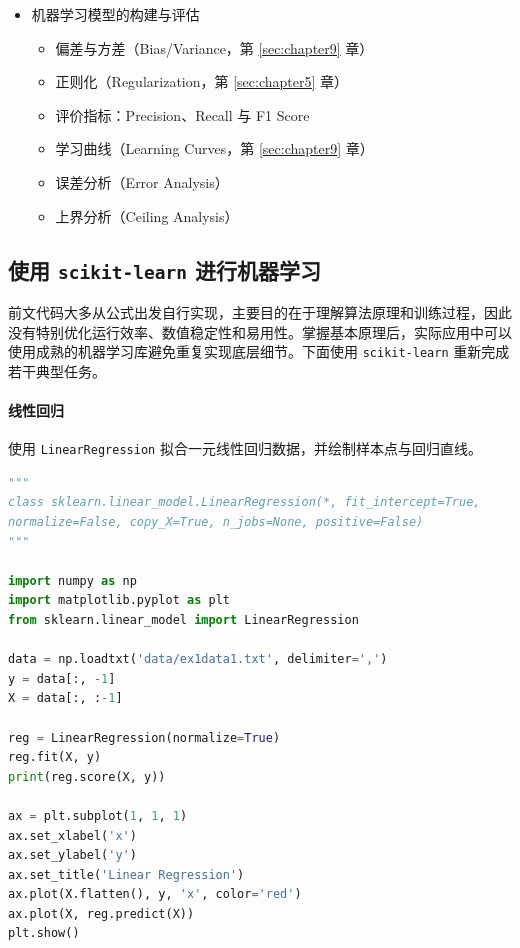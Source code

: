 \begin{itemize}
    \item 机器学习模型的构建与评估
      \begin{itemize}
        \item 偏差与方差（Bias/Variance，第 \ref{sec:chapter9} 章）
        \item 正则化（Regularization，第 \ref{sec:chapter5} 章）
        \item 评价指标：Precision、Recall 与 F1 Score
        \item 学习曲线（Learning Curves，第 \ref{sec:chapter9} 章）
        \item 误差分析（Error Analysis）
        \item 上界分析（Ceiling Analysis）
      \end{itemize}
\end{itemize}


\subsection{使用 \texttt{scikit-learn} 进行机器学习}

前文代码大多从公式出发自行实现，主要目的在于理解算法原理和训练过程，因此没有特别优化运行效率、数值稳定性和易用性。掌握基本原理后，实际应用中可以使用成熟的机器学习库避免重复实现底层细节。下面使用 \texttt{scikit-learn} 重新完成若干典型任务。

\paragraph{线性回归}

使用 \texttt{LinearRegression} 拟合一元线性回归数据，并绘制样本点与回归直线。

\begin{center}
\begin{lstlisting}[language=Python]
"""
class sklearn.linear_model.LinearRegression(*, fit_intercept=True, 
normalize=False, copy_X=True, n_jobs=None, positive=False)
"""

import numpy as np
import matplotlib.pyplot as plt
from sklearn.linear_model import LinearRegression

data = np.loadtxt('data/ex1data1.txt', delimiter=',')
y = data[:, -1]
X = data[:, :-1]

reg = LinearRegression(normalize=True)
reg.fit(X, y)
print(reg.score(X, y))

ax = plt.subplot(1, 1, 1)
ax.set_xlabel('x')
ax.set_ylabel('y')
ax.set_title('Linear Regression')
ax.plot(X.flatten(), y, 'x', color='red')
ax.plot(X, reg.predict(X))
plt.show()
\end{lstlisting}
\end{center}

